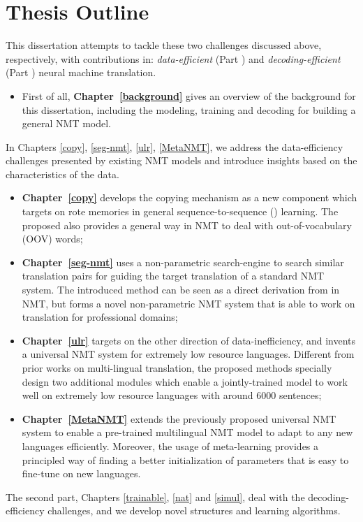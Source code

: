 \section{Thesis Outline}
This dissertation attempts to tackle these two challenges discussed above, respectively, with contributions in: {\it data-efficient} (Part ) and {\it decoding-efficient} (Part ) neural machine translation. 
\begin{itemize}
\item First of all, \textbf{ Chapter~\ref{background}} gives an overview  of  the background for this dissertation,  including the modeling, training and decoding for building a general NMT model. 
\end{itemize}
In Chapters \ref{copy}, \ref{seg-nmt}, \ref{ulr}, \ref{MetaNMT}, we address the data-efficiency challenges presented by existing NMT models and introduce insights based on the characteristics of the data.
\begin{itemize}
\item \textbf{Chapter~\ref{copy}} develops the copying mechanism as a new component  which targets on rote memories in general sequence-to-sequence (\sts) learning. The proposed \copynet also provides a general way in NMT to deal with out-of-vocabulary (OOV) words; 
\item \textbf{Chapter~\ref{seg-nmt}} uses a non-parametric search-engine to search similar translation pairs for guiding the target translation of a standard NMT system. The introduced method can be seen as a direct derivation from \copynet in NMT, but forms a novel non-parametric NMT system that is able to work on translation for professional domains; 
\item \textbf{Chapter~\ref{ulr}} targets on the other direction of data-inefficiency, and invents a universal NMT system for extremely low resource languages. Different from prior works on multi-lingual translation, the proposed methods specially design two additional modules which enable a jointly-trained model to work well on extremely low resource languages with around 6000 sentences; 
\item \textbf{Chapter~\ref{MetaNMT}} extends the previously proposed universal NMT system to enable a pre-trained multilingual NMT model to adapt to any new languages efficiently. Moreover, the usage of meta-learning provides a principled way of finding a better initialization of parameters that is easy to fine-tune on new languages.
\end{itemize}
The second part, Chapters \ref{trainable}, \ref{nat} and \ref{simul}, deal with the decoding-efficiency challenges, and we develop novel structures and learning algorithms.
